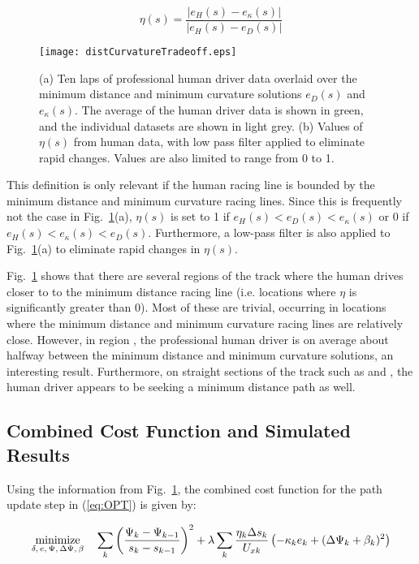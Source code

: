 \begin{equation}
\eta(s) = \frac{|e_H(s) - e_\kappa(s)|}{|e_H(s) - e_D(s)|}
\end{equation} 

 \begin{figure}[h!]
\centering
\texttt{[image: distCurvatureTradeoff.eps]}
\caption[Ten laps of professional human driver data overlaid over the minimum distance and minimum curvature solutions]{(a) Ten laps of professional human driver data overlaid over the minimum distance and minimum curvature solutions $e_D(s)$ and $e_\kappa(s)$. The average of the human driver
data is shown in green, and the individual datasets are shown in light grey. (b) Values of $\eta(s)$ from human data, with low pass filter applied to eliminate rapid changes. Values are also limited to range from 0 to 1.}
\label{fig:DKtrade}
\end{figure}

\newpage
This definition is only relevant if the human racing line is bounded by the minimum distance and minimum curvature racing lines. Since this is frequently not
the case in Fig.~\ref{fig:DKtrade}(a), $\eta(s)$ is set to 1 if $e_H(s) < e_D(s) < e_\kappa(s)$ or 0 if $e_H(s) < e_\kappa(s) < e_D(s)$. Furthermore, a low-pass filter is also applied to Fig.~\ref{fig:DKtrade}(a) to eliminate rapid changes in $\eta(s)$.

Fig.~\ref{fig:DKtrade} shows that there are several regions of the track where the human drives closer to to the minimum distance racing line (i.e. locations where
$\eta$ is significantly greater than 0). Most of these are trivial, occurring in locations where the minimum distance and minimum curvature racing lines are
relatively close. However, in region , the professional human driver is on average about halfway between the minimum distance and minimum curvature solutions,
an interesting result. Furthermore, on straight sections of the track such as  and , the human driver appears to be seeking a minimum distance path as well. 

\subsection{Combined Cost Function and Simulated Results}

Using the information from Fig.~\ref{fig:DKtrade}, the combined cost function for the path update step in (\ref{eq:OPT}) is given by:

\begin{equation}
\label{eq:OPT2}
\underset{\delta, \hspace{.5mm} e, \hspace{.5mm} \Psi, \hspace{.5mm} \Delta\Psi, \hspace{.5mm} \beta}{\text{minimize}} \quad \sum_{k} \left(\frac{\Psi_k - \Psi_{k-1}}{s_k - s_{k-1}}\right)^2 + \lambda\sum_k \frac{\eta_k \Delta s_k}{U_{xk}} \left(-\kappa_ke_k + (\Delta\Psi_k + \beta_k)^2\right)
\end{equation}

